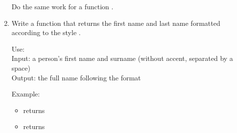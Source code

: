 \documentclass[11pt,class=report,crop=false]{standalone}
\begin{document}
\begin{activite}
\begin{enumerate}
   Do the same work for a function .
  
   \item Write a function  that returns the first name and last name formatted according to the style .
   
   
  \begin{fonction}
  Use: \\
  Input: a person's first name and surname (without accent, separated by a space)\\
  Output: the full name following the format 
  
  \medskip
     
   Example:
   \begin{itemize}  
    \item {} returns 
    \item {} returns 
  \end{itemize} 
  \end{fonction}    
    
\end{enumerate}
\end{activite}


\end{document}
